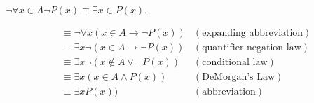 
$\neg\forall x \in A \neg P(x) \equiv \exists x \in P(x).$

\begin{align*}
  &\equiv \neg\forall x(x \in A \rightarrow \neg P(x)) &(\textrm{expanding
    abbreviation})\\
  &\equiv \exists x \neg(x \in A \rightarrow \neg P(x)) &(\textrm{quantifier negation
    law})\\
  &\equiv \exists x \neg(x \notin A \lor \neg P(x)) &(\textrm{conditional law})\\
  &\equiv \exists x (x \in A \land P(x)) &(\textrm{DeMorgan's Law})\\
  &\equiv \exists x P(x)) &(\textrm{abbreviation})\\
\end{align*}
